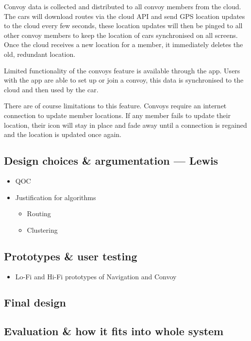 \documentclass{article}
\begin{document}
Convoy data is collected and distributed to all convoy members from the cloud. The cars will download routes via the cloud API and send GPS location updates to the cloud every few seconds, these location updates will then be pinged to all other convoy members to keep the location of cars synchronised on all screens. Once the cloud receives a new location for a member, it immediately deletes the old, redundant location.

Limited functionality of the convoys feature is available through the app. Users with the app are able to set up or join a convoy, this data is synchronised to the cloud and then used by the car.

There are of course limitations to this feature. Convoys require an internet connection to update member locations. If any member fails to update their location, their icon will stay in place and fade away until a connection is regained and the location is updated once again.

\subsection{Design choices \& argumentation --- Lewis}\label{ssec:nav-design}
\begin{itemize}
  \item QOC
  \item Justification for algorithms
    \begin{itemize}
      \item Routing
      \item Clustering
    \end{itemize}
\end{itemize}

\subsection{Prototypes \& user testing}\label{ssec:nav-prototypes-testing}
\begin{itemize}
  \item Lo-Fi and Hi-Fi prototypes of Navigation and Convoy
\end{itemize}

\subsection{Final design}\label{ssec:nav-final-design}

\subsection{Evaluation \& how it fits into whole system}\label{ssec:nav-evaluation}
\end{document}
